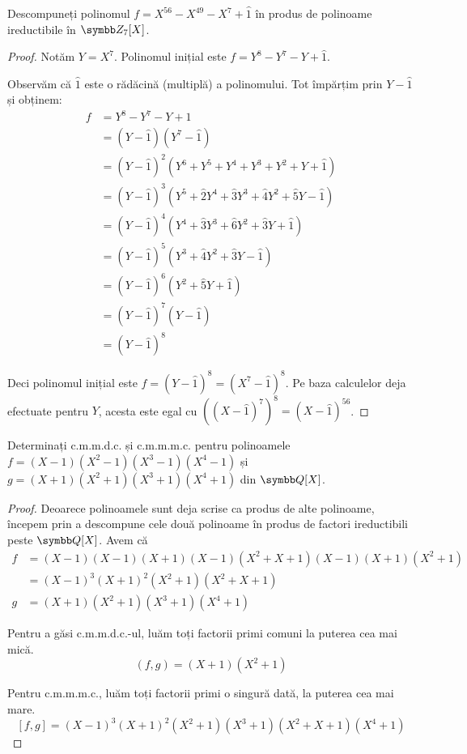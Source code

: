\begin{exercise}[2.11]
Descompuneți polinomul \(f = X^{56} - X^{49} - X^7 + \widehat{1}\) în produs de polinoame ireductibile în \(\integersmod{7}[X]\).
\end{exercise}
\begin{proof}
Notăm \(Y = X^7\). Polinomul inițial este \(f = Y^8 - Y^7 - Y + \widehat{1}\).

Observăm că \(\widehat{1}\) este o rădăcină (multiplă) a polinomului. Tot împărțim prin \(Y - \widehat{1}\) și obținem:
\begin{align*}
    f &= Y^8 - Y^7 - Y + 1 \\
    &= (Y - \widehat{1}) (Y^7 - \widehat{1}) \\
    &= (Y - \widehat{1})^2 (Y^6 + Y^5 + Y^4 + Y^3 + Y^2 + Y + \widehat{1}) \\
    &= (Y - \widehat{1})^3 (Y^5 + \widehat{2} Y^4 + \widehat{3} Y^3 + \widehat{4} Y^2 + \widehat{5} Y - \widehat{1}) \\
    &= (Y - \widehat{1})^4 (Y^4 + \widehat{3} Y^3 + \widehat{6} Y^2 + \widehat{3} Y + \widehat{1}) \\
    &= (Y - \widehat{1})^5 (Y^3 + \widehat{4} Y^2 + \widehat{3} Y - \widehat{1}) \\
    &= (Y - \widehat{1})^6 (Y^2 + \widehat{5} Y + \widehat{1}) \\
    &= (Y - \widehat{1})^7 (Y - \widehat{1}) \\
    &= (Y - \widehat{1})^8
\end{align*}

Deci polinomul inițial este \(f = (Y - \widehat{1})^8 = (X^7 - \widehat{1})^8\). Pe baza calculelor deja efectuate pentru \(Y\), acesta este egal cu \(((X - \widehat{1})^7)^8 = (X - \widehat{1})^{56}\).
\end{proof}

\begin{exercise}[2.17]
Determinați c.m.m.d.c. și c.m.m.m.c. pentru polinoamele \(f = (X - 1)(X^2 - 1)(X^3 - 1)(X^4 - 1)\) și \(g = (X + 1)(X^2 + 1)(X^3 + 1)(X^4 + 1)\) din \(\rationals[X]\).
\end{exercise}
\begin{proof}
Deoarece polinoamele sunt deja scrise ca produs de alte polinoame, începem prin a descompune cele două polinoame în produs de factori ireductibili peste \(\rationals[X]\). Avem că
\begin{align*}
    f &= (X - 1)(X - 1)(X + 1)(X - 1)(X^2 + X + 1)(X - 1)(X + 1)(X^2 + 1) \\
    &= (X - 1)^3 (X + 1)^2 (X^2 + 1) (X^2 + X + 1) \\
    g &= (X + 1)(X^2 + 1)(X^3 + 1)(X^4 + 1)
\end{align*}

Pentru a găsi c.m.m.d.c.-ul, luăm toți factorii primi comuni la puterea cea mai mică.
\[
(f, g) = (X + 1)(X^2 + 1)
\]

Pentru c.m.m.m.c., luăm toți factorii primi o singură dată, la puterea cea mai mare.
\[
[f, g] = (X - 1)^3 (X + 1)^2 (X^2 + 1)(X^3 + 1)(X^2 + X + 1)(X^4 + 1)
\]
\end{proof}

